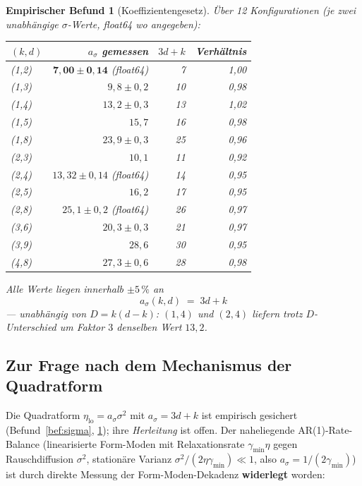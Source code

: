 \documentclass[11pt,a4paper]{article}
\newtheorem{befund}{Empirischer Befund}
\theoremstyle{remark}
\begin{document}
\begin{befund}[Koeffizientengesetz]\label{bef:3dk}
Über 12 Konfigurationen (je zwei unabhängige $\sigma$-Werte, float64 wo
angegeben):
\begin{center}
\begin{tabular}{lrrr}
\toprule
$(k,d)$ & $a_\sigma$ gemessen & $3d+k$ & Verhältnis\\
\midrule
(1,2) & $\mathbf{7{,}00\pm0{,}14}$ (float64) & 7 & 1{,}00\\
(1,3) & $9{,}8\pm0{,}2$ & 10 & 0{,}98\\
(1,4) & $13{,}2\pm0{,}3$ & 13 & 1{,}02\\
(1,5) & $15{,}7$ & 16 & 0{,}98\\
(1,8) & $23{,}9\pm0{,}3$ & 25 & 0{,}96\\
(2,3) & $10{,}1$ & 11 & 0{,}92\\
(2,4) & $13{,}32\pm0{,}14$ (float64) & 14 & 0{,}95\\
(2,5) & $16{,}2$ & 17 & 0{,}95\\
(2,8) & $25{,}1\pm0{,}2$ (float64) & 26 & 0{,}97\\
(3,6) & $20{,}3\pm0{,}3$ & 21 & 0{,}97\\
(3,9) & $28{,}6$ & 30 & 0{,}95\\
(4,8) & $27{,}3\pm0{,}6$ & 28 & 0{,}98\\
\bottomrule
\end{tabular}
\end{center}
Alle Werte liegen innerhalb $\pm5\,\%$ an
\begin{equation}\label{eq:3dk}
\boxed{\;a_\sigma(k,d)\;=\;3d+k\;}
\end{equation}
--- unabhängig von $D=k(d-k)$: $(1,4)$ und $(2,4)$ liefern trotz
$D$-Unterschied um Faktor $3$ denselben Wert $13{,}2$.
\end{befund}

\subsection{Zur Frage nach dem Mechanismus der Quadratform}

Die Quadratform $\eta_{\mathrm{lo}}=a_\sigma\sigma^2$ mit
$a_\sigma=3d+k$ ist empirisch gesichert (Befund~\ref{bef:sigma},
\ref{bef:3dk}); ihre \emph{Herleitung} ist offen. Der naheliegende
AR(1)-Rate-Balance (linearisierte Form-Moden mit Relaxationsrate
$\gamma_{\min}\eta$ gegen Rauschdiffusion $\sigma^2$, stationäre Varianz
$\sigma^2/(2\eta\gamma_{\min})\ll1$, also
$a_\sigma=1/(2\gamma_{\min})$) ist durch direkte Messung der
Form-Moden-Dekadenz \textbf{widerlegt} worden:
\end{document}
